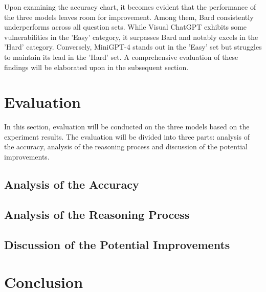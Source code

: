 \documentclass[journal,10pt]{IEEEtran}
\begin{document}
Upon examining the accuracy chart, it becomes evident that the performance of the three models leaves room for improvement. Among them, Bard consistently underperforms across all question sets. While Visual ChatGPT exhibits some vulnerabilities in the 'Easy' category, it surpasses Bard and notably excels in the 'Hard' category. Conversely, MiniGPT-4 stands out in the 'Easy' set but struggles to maintain its lead in the 'Hard' set. A comprehensive evaluation of these findings will be elaborated upon in the subsequent section.

\section{Evaluation}
In this section, evaluation will be conducted on the three models based on the experiment results. The evaluation will be divided into three parts: analysis of the accuracy, analysis of the reasoning process and discussion of the potential improvements.
\subsection{Analysis of the Accuracy}

\subsection{Analysis of the Reasoning Process}

\subsection{Discussion of the Potential Improvements}

\section{Conclusion}




\appendices

\label{Chart}
\clearpage

\label{Easy}

\label{Hard}
\end{document}
